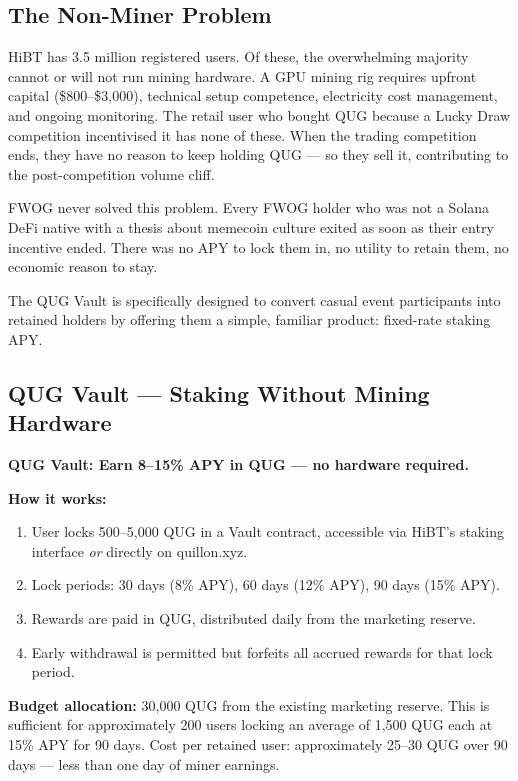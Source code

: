 \documentclass[11pt,a4paper]{article}
\begin{document}
\subsection{The Non-Miner Problem}

HiBT has 3.5 million registered users. Of these, the overwhelming majority cannot or will not run mining hardware. A GPU mining rig requires upfront capital (\$800--\$3,000), technical setup competence, electricity cost management, and ongoing monitoring. The retail user who bought QUG because a Lucky Draw competition incentivised it has none of these. When the trading competition ends, they have no reason to keep holding QUG — so they sell it, contributing to the post-competition volume cliff.

FWOG never solved this problem. Every FWOG holder who was not a Solana DeFi native with a thesis about memecoin culture exited as soon as their entry incentive ended. There was no APY to lock them in, no utility to retain them, no economic reason to stay.

The QUG Vault is specifically designed to convert casual event participants into retained holders by offering them a simple, familiar product: fixed-rate staking APY.

\subsection{QUG Vault — Staking Without Mining Hardware}

\begin{tcolorbox}[purplebox]
\textbf{QUG Vault: Earn 8--15\% APY in QUG — no hardware required.}

\medskip
\textbf{How it works:}
\begin{enumerate}[leftmargin=1em, itemsep=2pt]
  \item User locks 500--5,000 QUG in a Vault contract, accessible via HiBT's staking interface \emph{or} directly on quillon.xyz.
  \item Lock periods: 30 days (8\% APY), 60 days (12\% APY), 90 days (15\% APY).
  \item Rewards are paid in QUG, distributed daily from the marketing reserve.
  \item Early withdrawal is permitted but forfeits all accrued rewards for that lock period.
\end{enumerate}

\textbf{Budget allocation:} 30,000 QUG from the existing marketing reserve. This is sufficient for approximately 200 users locking an average of 1,500 QUG each at 15\% APY for 90 days. Cost per retained user: approximately 25--30 QUG over 90 days — less than one day of miner earnings.
\end{tcolorbox}
\end{document}
